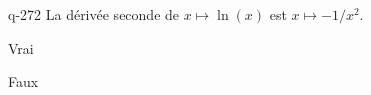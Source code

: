 \begin{truefalse}{q-272}
La dérivée seconde de $x\mapsto \ln(x)$ est $x\mapsto -1/x^2$.
\item* Vrai
\item Faux
\end{truefalse}

